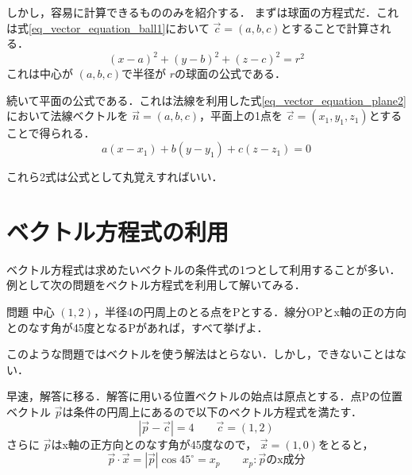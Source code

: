 \documentclass[dvipdfmx]{jsarticle}
\begin{document}
    しかし，容易に計算できるもののみを紹介する．
    まずは球面の方程式だ．これは式\eqref{eq_vector_equation_ball1}において \(\vec{c}=(a,b,c)\)とすることで計算される．
    \begin{equation}
        (x-a)^2+(y-b)^2+(z-c)^2=r^2
    \end{equation}
    これは中心が \((a,b,c)\)で半径が \(r\)の球面の公式である．

    続いて平面の公式である．これは法線を利用した式\eqref{eq_vector_equation_plane2}において法線ベクトルを \(\vec{n}=(a,b,c)\)，平面上の1点を \(\vec{c}=(x_1,y_1,z_1)\)とすることで得られる．
    \begin{equation}
        a(x-x_1)+b(y-y_1)+c(z-z_1)=0
    \end{equation}

    これら2式は公式として丸覚えすればいい．


    \section{ベクトル方程式の利用}
    ベクトル方程式は求めたいベクトルの条件式の1つとして利用することが多い．例として次の問題をベクトル方程式を利用して解いてみる．
    \begin{itembox}[l]{問題}
        中心 \((1,2)\)，半径4の円周上のとる点をPとする．線分OPとx軸の正の方向とのなす角が45度となるPがあれば，すべて挙げよ．
    \end{itembox}
    このような問題ではベクトルを使う解法はとらない．しかし，できないことはない．

    早速，解答に移る．解答に用いる位置ベクトルの始点は原点とする．点Pの位置ベクトル \(\vec{p}\)は条件の円周上にあるので以下のベクトル方程式を満たす．
    \[
    |\vec{p}-\vec{c}|=4\qquad \vec{c}=(1,2)
    \]
    さらに \(\vec{p}\)はx軸の正方向とのなす角が45度なので， \(\vec{x}=(1,0)\)をとると，
    \[
    \vec{p}\cdot\vec{x}=|\vec{p}|\cos45^\circ = x_p\qquad x_p:\vec{p}\text{のx成分}
    \]
\end{document}

